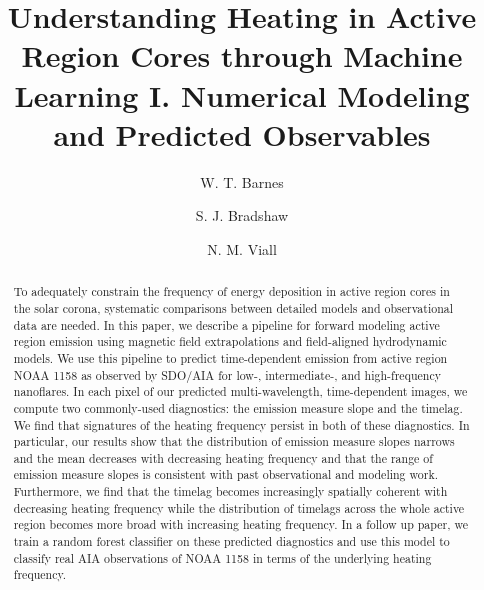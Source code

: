 \documentclass[preprint2,linenumbers]{aastex62}
\newcommand{\AR}{active region}
\begin{document}
\title{Understanding Heating in Active Region Cores through Machine Learning I. Numerical Modeling and Predicted Observables}
\author[0000-0001-9642-6089]{W. T. Barnes}
\author{S. J. Bradshaw}
\author{N. M. Viall}
\begin{abstract}
To adequately constrain the frequency of energy deposition in \AR{} cores in the solar corona, systematic comparisons between detailed models and observational data are needed. In this paper, we describe a pipeline for forward modeling \AR{} emission using magnetic field extrapolations and field-aligned hydrodynamic models. We use this pipeline to predict time-dependent emission from \AR{} NOAA 1158 as observed by SDO/AIA for low-, intermediate-, and high-frequency nanoflares. In each pixel of our predicted multi-wavelength, time-dependent images, we compute two commonly-used diagnostics: the emission measure slope and the timelag. We find that signatures of the heating frequency persist in both of these diagnostics. In particular, our results show that the distribution of emission measure slopes narrows and the mean decreases with decreasing heating frequency and that the range of emission measure slopes is consistent with past observational and modeling work. Furthermore, we find that the timelag becomes increasingly spatially coherent with decreasing heating frequency while the distribution of timelags across the whole \AR{} becomes more broad with increasing heating frequency. In a follow up paper, we train a random forest classifier on these predicted diagnostics and use this model to classify real AIA observations of NOAA 1158 in terms of the underlying heating frequency.
\end{abstract}
\end{document}
